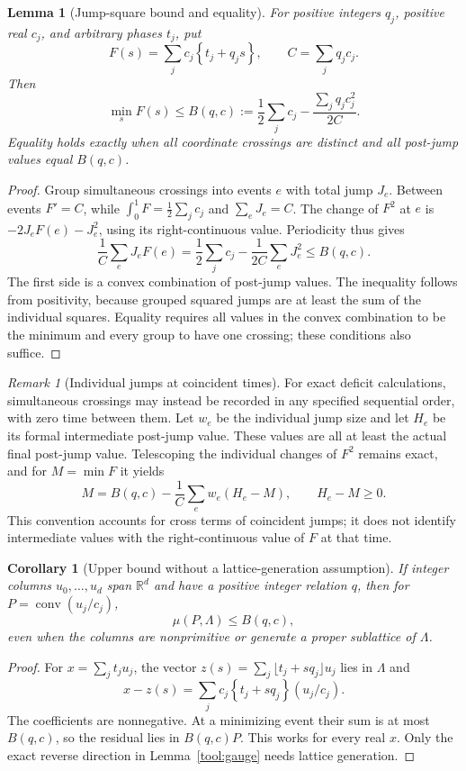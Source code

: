 \documentclass[11pt,a4paper]{article}
\newtheorem{lemma}[theorem]{Lemma}
\newtheorem{corollary}[theorem]{Corollary}
\theoremstyle{remark}\newtheorem{remark}[theorem]{Remark}
\DeclareMathOperator{\conv}{conv}
\newcommand{\R}{\mathbb R}\newcommand{\Z}{\mathbb Z}
\newcommand{\fr}[1]{\left\{#1\right\}}\newcommand{\one}{\mathbf1}
\begin{document}
\begin{lemma}[Jump-square bound and equality]\label{tool:jump}
For positive integers $q_j$, positive real $c_j$, and arbitrary
phases $t_j$, put
\[
 F(s)=\sum_jc_j\fr{t_j+q_js},\qquad C=\sum_jq_jc_j.
\]
Then
\begin{equation}\label{tool:bound}
 \min_sF(s)\le B(q,c):=
 \frac12\sum_jc_j-\frac{\sum_jq_jc_j^2}{2C}.
\end{equation}
Equality holds exactly when all coordinate crossings are distinct
and all post-jump values equal $B(q,c)$.
\end{lemma}
\begin{proof}
Group simultaneous crossings into events $e$ with total jump $J_e$.
Between events $F'=C$, while
$\int_0^1F=\tfrac12\sum_jc_j$ and $\sum_eJ_e=C$.
The change of $F^2$ at $e$ is $-2J_eF(e)-J_e^2$, using its
right-continuous value. Periodicity thus gives
\[
 \frac1C\sum_eJ_eF(e)
 =\frac12\sum_jc_j-\frac1{2C}\sum_eJ_e^2
 \le B(q,c).
\]
The first side is a convex combination of post-jump values.
The inequality follows from positivity, because grouped squared
jumps are at least the sum of the individual squares.
Equality requires all values in the convex combination to be the
minimum and every group to have one crossing; these conditions
also suffice.
\end{proof}

\begin{remark}[Individual jumps at coincident times]\label{tool:individual}
For exact deficit calculations, simultaneous crossings may instead
be recorded in any specified sequential order, with zero time
between them. Let $w_e$ be the individual jump size and let $H_e$
be its formal intermediate post-jump value. These values are all
at least the actual final post-jump value. Telescoping the individual
changes of $F^2$ remains exact, and for $M=\min F$ it yields
\begin{equation}\label{tool:deficit}
 M=B(q,c)-\frac1C\sum_e w_e(H_e-M),\qquad H_e-M\ge0.
\end{equation}
This convention accounts for cross terms of coincident jumps; it
does not identify intermediate values with the right-continuous
value of $F$ at that time.
\end{remark}

\begin{corollary}[Upper bound without a lattice-generation assumption]
\label{tool:upper}
If integer columns $u_0,\ldots,u_d$ span $\R^d$ and have a positive
integer relation $q$, then for $P=\conv(u_j/c_j)$,
\[
 \mu(P,\Lambda)\le B(q,c),
\]
even when the columns are nonprimitive or generate a proper
sublattice of $\Lambda$.
\end{corollary}
\begin{proof}
For $x=\sum_jt_ju_j$, the vector
$z(s)=\sum_j\lfloor t_j+sq_j\rfloor u_j$ lies in $\Lambda$ and
\[
 x-z(s)=\sum_jc_j\fr{t_j+sq_j}(u_j/c_j).
\]
The coefficients are nonnegative. At a minimizing event their
sum is at most $B(q,c)$, so the residual lies in $B(q,c)P$.
This works for every real $x$. Only the exact reverse direction
in Lemma~\ref{tool:gauge} needs lattice generation.
\end{proof}
\end{document}
